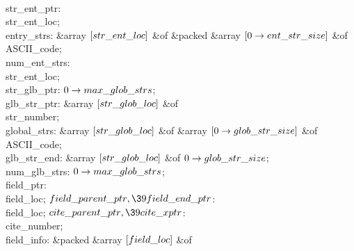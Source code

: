 \4\\{str\_ent\_ptr}: \\{str\_ent\_loc};\6
\4\\{entry\_strs}: \&{array} $[\\{str\_ent\_loc}]$ \1\&{of}\5
\&{packed} \&{array} $[0\to\\{ent\_str\_size}]$ \1\&{of}\5
\\{ASCII\_code};\2\2\6
\4\\{num\_ent\_strs}: \\{str\_ent\_loc};\6
\4\\{str\_glb\_ptr}: $0\to\\{max\_glob\_strs}$;\6
\4\\{glb\_str\_ptr}: \&{array} $[\\{str\_glob\_loc}]$ \1\&{of}\5
\\{str\_number};\2\6
\4\\{global\_strs}: \&{array} $[\\{str\_glob\_loc}]$ \1\&{of}\5
\&{array} $[0\to\\{glob\_str\_size}]$ \1\&{of}\5
\\{ASCII\_code};\2\2\6
\4\\{glb\_str\_end}: \&{array} $[\\{str\_glob\_loc}]$ \1\&{of}\5
$0\to\\{glob\_str\_size}$;\2\6
\4\\{num\_glb\_strs}: $0\to\\{max\_glob\_strs}$;\6
\4\\{field\_ptr}: \\{field\_loc};\6
\4$\\{field\_parent\_ptr},\39\\{field\_end\_ptr}$: \\{field\_loc};\6
\4$\\{cite\_parent\_ptr},\39\\{cite\_xptr}$: \\{cite\_number};\6
\4\\{field\_info}: \&{packed} \&{array} $[\\{field\_loc}]$ \1\&{of}\5
